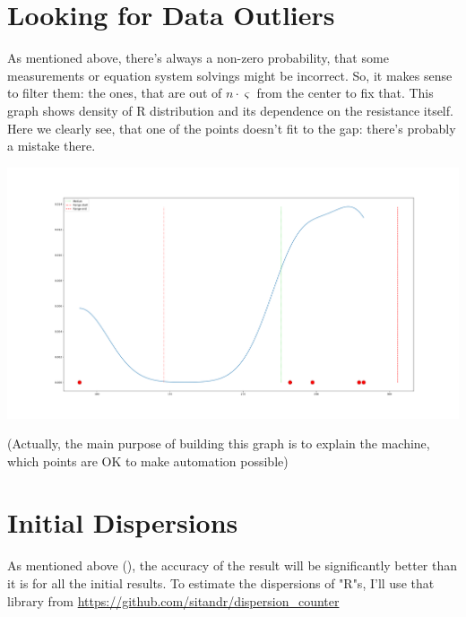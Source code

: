 \documentclass[11pt]{memoir}
\begin{document}
    \newpage
    \section {Looking for Data Outliers}\label{sec:looking-for-data-outliers}

    As mentioned above, there's always a non-zero probability, that some measurements or equation system solvings might be incorrect. \newline
    So, it makes sense to filter them: the ones, that are out of $n \cdot \varsigma$ from the center to fix that.\newline
    This graph shows density of R distribution and its dependence on the resistance itself.
    Here we clearly see, that one of the points doesn't fit to the gap: there's probably a mistake there. \newline

    \includegraphics[width=\linewidth]{../graphs/distribution.png}


    (Actually, the main purpose of building this graph is to explain the machine, which points are OK to make automation possible)

    \newpage
    \section {Initial Dispersions}\label{sec:initial-dispersions}
    \newline
    As mentioned above (), the accuracy of the result will be significantly better than it is for all the initial results.\newline
    To estimate the dispersions of "R"s, I'll use that library from \newline
    \url{https://github.com/sitandr/dispersion_counter}\newline
\end{document}
